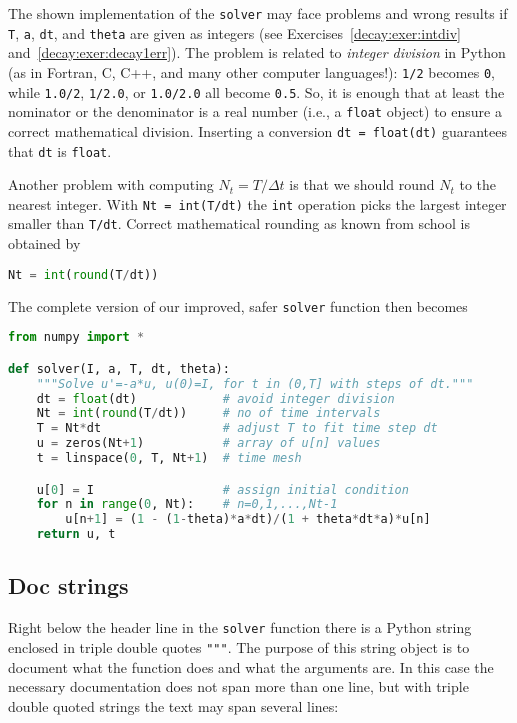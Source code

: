 \documentclass[graybox,sectrefs,envcountresetchap,open=right,final]{svmonodo}
\begin{document}
The shown implementation of the \texttt{solver} may face problems and
wrong results if \texttt{T}, \texttt{a}, \texttt{dt}, and \texttt{theta} are given as integers
(see Exercises~\ref{decay:exer:intdiv} and~\ref{decay:exer:decay1err}).
The problem is related to \emph{integer division} in Python (as
in Fortran, C, C++, and many other computer languages!): \texttt{1/2} becomes \texttt{0},
while \texttt{1.0/2}, \texttt{1/2.0}, or \texttt{1.0/2.0} all become \texttt{0.5}. So, it is enough
that at least the nominator or the denominator is a real number
(i.e., a \texttt{float} object)
to ensure a correct mathematical division. Inserting
a conversion \texttt{dt = float(dt)}
guarantees that \texttt{dt} is
\texttt{float}.

Another problem with computing $N_t=T/\Delta t$ is that we should
round $N_t$ to the nearest integer. With \texttt{Nt = int(T/dt)} the \texttt{int}
operation picks the largest integer smaller than \texttt{T/dt}. Correct
mathematical rounding as known from school is obtained by
\begin{lstlisting}[language=Python,style=blue1_bluegreen]
Nt = int(round(T/dt))
\end{lstlisting}
The complete version of our improved, safer \texttt{solver} function then becomes

\begin{lstlisting}[language=Python,style=blue1_bluegreen]
from numpy import *

def solver(I, a, T, dt, theta):
    """Solve u'=-a*u, u(0)=I, for t in (0,T] with steps of dt."""
    dt = float(dt)            # avoid integer division
    Nt = int(round(T/dt))     # no of time intervals
    T = Nt*dt                 # adjust T to fit time step dt
    u = zeros(Nt+1)           # array of u[n] values
    t = linspace(0, T, Nt+1)  # time mesh

    u[0] = I                  # assign initial condition
    for n in range(0, Nt):    # n=0,1,...,Nt-1
        u[n+1] = (1 - (1-theta)*a*dt)/(1 + theta*dt*a)*u[n]
    return u, t
\end{lstlisting}


\subsection{Doc strings}


Right below the header line in the \texttt{solver} function there is a
Python string enclosed in triple double quotes \texttt{"""}.
The purpose of this string object is to document what the function
does and what the arguments are. In this case the necessary
documentation does not span more than one line, but with triple double
quoted strings the text may span several lines:
\end{document}
